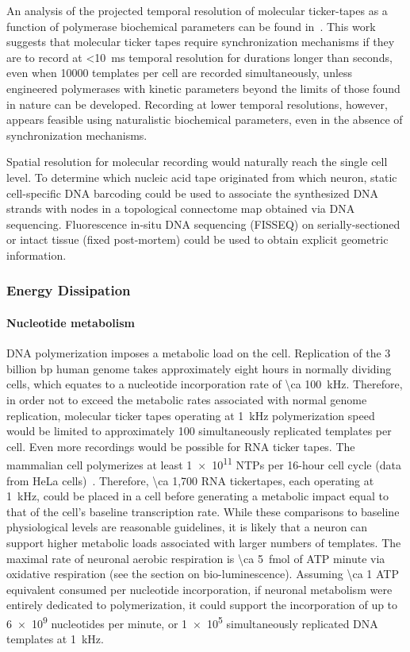 An analysis of the projected temporal resolution of molecular ticker-tapes as a function of polymerase biochemical parameters can be found in~\cite{glaser13}.
This work suggests that molecular ticker tapes require synchronization mechanisms if they are to record at \SI{<10}{\ms} temporal resolution for durations longer than seconds, even when \num{10000} templates per cell are recorded simultaneously, unless engineered polymerases with kinetic parameters beyond the limits of those found in nature can be developed.
Recording at lower temporal resolutions, however, appears feasible using naturalistic biochemical parameters, even in the absence of synchronization mechanisms.

Spatial resolution for molecular recording would naturally reach the single cell level. To determine which nucleic acid tape originated from which neuron, static cell-specific DNA barcoding could be used \cite{zador12} to associate the synthesized DNA strands with nodes in a topological connectome map obtained via DNA sequencing.  Fluorescence in-situ DNA sequencing (FISSEQ) \cite{Lee2013InSitu} on serially-sectioned or intact tissue (fixed post-mortem) \cite{chung2013structural} could be used to obtain explicit geometric information.

\subsubsection{Energy Dissipation}
\paragraph{Nucleotide metabolism}
DNA polymerization imposes a metabolic load on the cell.
Replication of the 3 billion bp human genome takes approximately eight hours in normally dividing cells, which equates to a nucleotide incorporation rate of \SI{\ca 100}{\kHz}.
Therefore, in order not to exceed the metabolic rates associated with normal genome replication, molecular ticker tapes operating at \SI{1}{\kHz} polymerization speed~\cite{kelman95} would be limited to approximately 100 simultaneously replicated templates per cell.
Even more recordings would be possible for RNA ticker tapes.
The mammalian cell polymerizes at least \num{1e11} NTPs per 16-hour cell cycle (data from HeLa cells)~\cite{jackson00}.
Therefore, \num{\ca 1,700} RNA tickertapes, each operating at \SI{1}{\kHz}, could be placed in a cell before generating a metabolic impact equal to that of the cell's baseline transcription rate.
While these comparisons to baseline physiological levels are reasonable guidelines, it is likely that a neuron can support higher metabolic loads associated with larger numbers of templates.
The maximal rate of neuronal aerobic respiration is \SI{\ca 5}{\femto\mole} of ATP minute via oxidative respiration (see the section on bio-luminescence). Assuming \num{\ca 1} ATP equivalent consumed per nucleotide incorporation, if neuronal metabolism were entirely dedicated to polymerization, it could support the incorporation of up to \num{6e9} nucleotides per minute, or \num{1e5} simultaneously replicated DNA templates at \SI{1}{\kHz}. %

